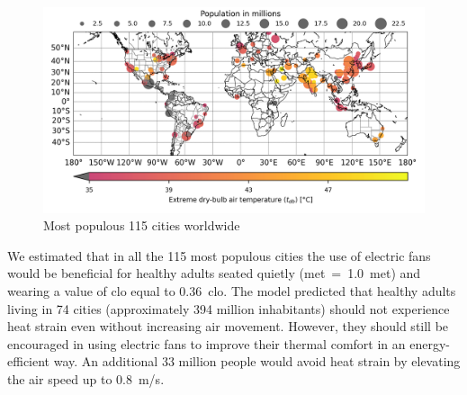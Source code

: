 \begin{figure}[thb!]
    \centering
    \includegraphics[width=\textwidth]{figures/map-population-temperature}
    \caption{Most populous 115 cities worldwide}
    \label{fig:map-population-temperature}
\end{figure}


We estimated that in all the 115 most populous cities the use of electric fans would be beneficial for healthy adults seated quietly (\ac{met}~=~1.0~met) and wearing a value of \ac{clo} equal to 0.36~clo.
The  model predicted that healthy adults living in 74 cities (approximately 394 million inhabitants) should not experience heat strain even without increasing air movement.
However, they should still be encouraged in using electric fans to improve their thermal comfort in an energy-efficient way.
An additional 33 million people would avoid heat strain by elevating the air speed up to 0.8~m/s.

